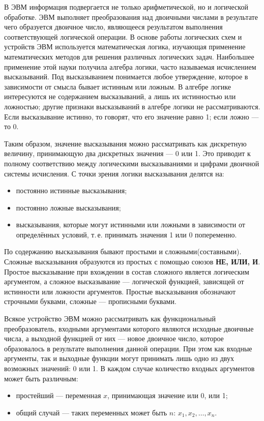 \documentclass[10pt,a4paper,titlepage]{article}
\begin{document}
В ЭВМ информация подвергается не только арифметической, но и логической обработке.
ЭВМ выполняет преобразования над двоичными числами в результате чего образуется двоичное число, являющееся результатом выполнения соответствующей логической операции.
В основе работы логических схем и устройств ЭВМ используется математическая логика, изучающая применение математических методов для решения различных логических задач.
Наибольшее применение этой науки получила алгебра логики, часто называемая исчислением высказываний.
Под высказыванием понимается любое утверждение, которое в зависимости от смысла бывает истинным или ложным.
В алгебре логике интересуются не содержанием высказываний, а лишь их истинностью или ложностью; другие признаки высказываний в алгебре логики не рассматриваются.
Если высказывание истинно, то говорят, что его значение равно 1; если ложно --- то 0.

Таким образом, значение высказывания можно рассматривать как дискретную величину, принимающую два дискретных значения --- 0 или 1.
Это приводит к полному соответствию между логическими высказываниями и цифрами двоичной системы исчисления.
С точки зрения логики высказывания делятся на:

\begin{itemize}
\item постоянно истинные высказывания;
\item постоянно ложные высказывания;
\item высказывания, которые могут истинными или ложными в зависимости от определённых условий, т.\,е. принимать значения 1 или 0 попеременно.
\end{itemize}

По содержанию высказывания бывают простыми и сложными(составными).
Сложные высказывания образуются из простых с помощью союзов \textbf{НЕ, ИЛИ, И}.
Простое высказывание при вхождении в состав сложного является логическим аргументом, а сложное высказывание --- логической функцией, зависящей от истинности или ложности аргументов.
Простые высказывания обозначают строчными буквами, сложные --- прописными буквами.

Всякое устройство ЭВМ можно рассматривать как функциональный преобразователь, входными аргументами которого являются исходные двоичные числа, а выходной функцией от них --- новое двоичное число, которое образовалось в результате выполнения данной операции.
При этом как входные аргументы, так и выходные функции могут принимать лишь одно из двух возможных значений: 0 или 1.
В каждом случае количество входных аргументов может быть различным:
\begin{itemize}
\item простейший --- переменная $x$, принимающая значение или 0, или 1;
\item общий случай --- таких переменных может быть $n$: $x_1, x_2, \dots, x_n$.
\end{itemize}
\end{document}
